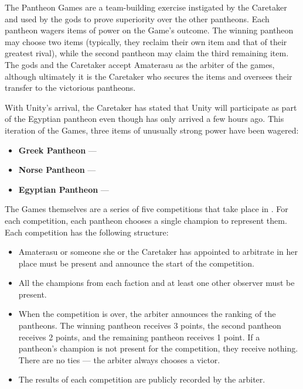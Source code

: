 \documentclass[green]{guardians}
\begin{document}
\name{\gPantheonGames{}}

The Pantheon Games are a team-building exercise instigated by the Caretaker and used by the gods to prove superiority over the other pantheons. Each pantheon wagers items of power on the Game's outcome. The winning pantheon may choose two items (typically, they reclaim their own item and that of their greatest rival), while the second pantheon may claim the third remaining item. The gods and the Caretaker accept Amaterasu as the arbiter of the games, although ultimately it is the Caretaker who secures the items and oversees their transfer to the victorious pantheons.

With Unity's arrival, the Caretaker has stated that Unity will participate as part of the Egyptian pantheon even though \cUnity{\they} has only arrived a few hours ago. This iteration of the Games, three items of unusually strong power have been wagered:

\begin{itemize}
  \item \textbf{Greek Pantheon} --- \iSandals{}
  \item \textbf{Norse Pantheon} --- \iHammer{}
	\item \textbf{Egyptian Pantheon} --- \iNecro{}
\end{itemize}

The Games themselves are a series of five competitions that take place in \pAmphitheater{}. For each competition, each pantheon chooses a single champion to represent them. Each competition has the following structure:

\begin{itemize}
  \item Amaterasu or someone she or the Caretaker has appointed to arbitrate in her place must be present and announce the start of the competition.
	\item All the champions from each faction and at least one other observer must be present.
	\item When the competition is over, the arbiter announces the ranking of the pantheons. The winning pantheon receives 3 points, the second pantheon receives 2 points, and the remaining pantheon receives 1 point. If a pantheon's champion is not present for the competition, they receive nothing. There are no ties --- the arbiter always chooses a victor.
	\item The results of each competition are publicly recorded by the arbiter.
\end{itemize}
 
\end{document}
